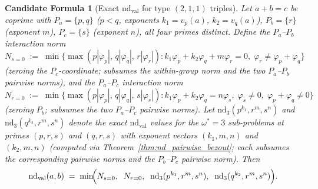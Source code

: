 \documentclass[12pt]{article}
\newtheorem{candidate}{Candidate Formula}
\theoremstyle{definition}
\begin{document}
{\raggedright
\begin{candidate}[Exact $\mathrm{nd}_{\mathrm{val}}$ for type $(2,1,1)$ triples]\label{thm:nd_type211}
  Let $a + b = c$ be coprime with $P_a = \{p, q\}$ ($p < q$, exponents
  $k_1 = v_p(a)$, $k_2 = v_q(a)$), $P_b = \{r\}$ (exponent $m$), $P_c = \{s\}$
  (exponent $n$), all four primes distinct.  Define the
  \emph{$P_a$--$P_b$ interaction norm}
  \[
    N_{s=0} \;:=\; \min\bigl\{\max(p|\varphi_p|,\,q|\varphi_q|,\,r|\varphi_r|) :
      k_1\varphi_p + k_2\varphi_q + m\varphi_r = 0,\;
      \varphi_r \ne \varphi_p + \varphi_q\bigr\}
  \]
  (zeroing the $P_c$-coordinate; subsumes the within-group norm and the two
  $P_a$--$P_b$ pairwise norms), and the \emph{$P_a$--$P_c$ interaction norm}
  \[
    N_{r=0} \;:=\; \min\bigl\{\max(p|\varphi_p|,\,q|\varphi_q|,\,s|\varphi_s|) :
      k_1\varphi_p + k_2\varphi_q = n\varphi_s,\;\varphi_s \ne 0,\;
      \varphi_p + \varphi_q \ne 0\bigr\}
  \]
  (zeroing $P_b$; subsumes the two $P_a$--$P_c$ pairwise norms).
  Let $\mathrm{nd}_{3}(p^{k_1}, r^m, s^n)$ and $\mathrm{nd}_{3}(q^{k_2}, r^m, s^n)$ denote
  the exact $\mathrm{nd}_{\mathrm{val}}$ values for the $\omega^*=3$ sub-problems at primes $(p,r,s)$
  and $(q,r,s)$ with exponent vectors $(k_1,m,n)$ and $(k_2,m,n)$ (computed via
  Theorem~\ref{thm:nd_pairwise_bezout}; each subsumes the corresponding pairwise
  norms and the $P_b$--$P_c$ pairwise norm).  Then
  \[
    \mathrm{nd}_{\mathrm{val}}(a,b) \;=\; \min\!\Bigl(
      N_{s=0},\;\; N_{r=0},\;\;
      \mathrm{nd}_{3}(p^{k_1},r^m,s^n),\;\;
      \mathrm{nd}_{3}(q^{k_2},r^m,s^n)
    \Bigr).
  \]
\end{candidate}
}
\end{document}
